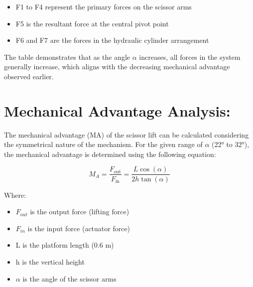 \documentclass[../../main]{subfiles}
\begin{document}
\begin{itemize}
\item
  F1 to F4 represent the primary forces on the scissor arms
\item
  F5 is the resultant force at the central pivot point
\item
  F6 and F7 are the forces in the hydraulic cylinder arrangement
\end{itemize}
The table demonstrates that as the angle $\alpha$ increases, all forces in the
system generally increase, which aligns with the decreasing mechanical
advantage observed earlier.

\newpage
\section{Mechanical Advantage Analysis:}

The mechanical advantage (MA) of the scissor lift can be calculated
considering the symmetrical nature of the mechanism. For the given range
of $\alpha$ (22° to 32°), the mechanical advantage is determined using the
following equation:

\begin{equation}
  M_A = \frac{F_{\text{out}}}{F_{\text{in}}} = \frac{L \cos(\alpha)}{2h \tan(\alpha)}
\end{equation}

Where:

\begin{itemize}
\item
  \(F_{out}\) is the output force (lifting force)
\item
  \(F_{in}\) is the input force (actuator force)
\item
  L is the platform length (0.6 m)
\item
  h is the vertical height
\item
  $\alpha$ is the angle of the scissor arms
\end{itemize}
\end{document}
